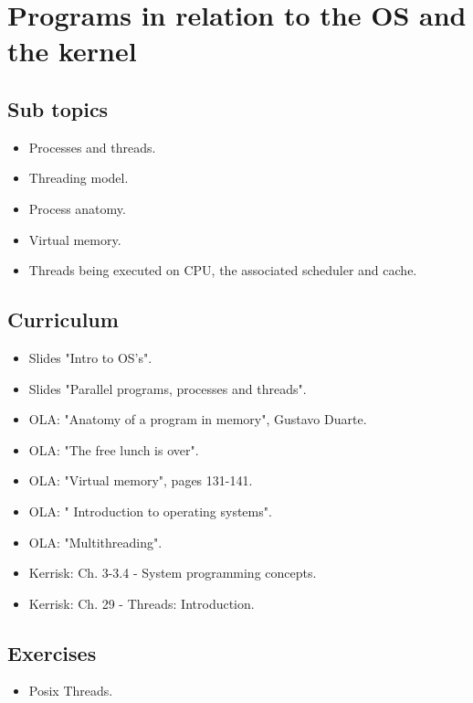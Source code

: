 \section{Programs in relation to the OS and the kernel}

\subsection{Sub topics}

\begin{itemize}
	\item Processes and threads.
	\item Threading model.
	\item Process anatomy.
	\item Virtual memory.
	\item Threads being executed on CPU, the associated scheduler and cache.
\end{itemize}

\subsection{Curriculum}

\begin{itemize}
	\item Slides "Intro to OS's".
	\item Slides "Parallel programs, processes and threads".
	\item OLA: "Anatomy of a program in memory", Gustavo Duarte.
	\item OLA: "The free lunch is over".
	\item OLA: "Virtual memory", pages 131-141.
	\item OLA: " Introduction to operating systems".
	\item OLA: "Multithreading".
	\item Kerrisk: Ch. 3-3.4 - System programming concepts.
	\item Kerrisk: Ch. 29 - Threads: Introduction.
\end{itemize}

\subsection{Exercises}

\begin{itemize}
	\item Posix Threads.
\end{itemize}

